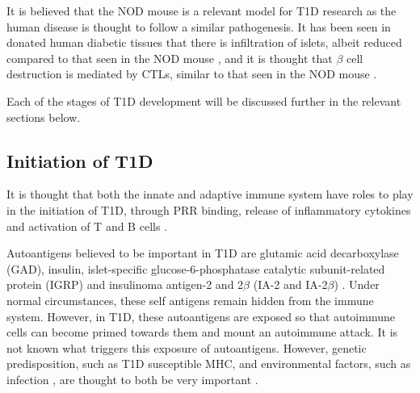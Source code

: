 It is believed that the NOD mouse is a relevant model for T1D research as the human disease is thought to follow a similar pathogenesis.
It has been seen in donated human diabetic tissues that there is infiltration of islets, albeit reduced compared to that seen in the NOD mouse \citep{Veld2014}, and it is thought that $\beta$ cell destruction is mediated by CTLs, similar to that seen in the NOD mouse \citep{Hanafusa2008}. 

Each of the stages of T1D development will be discussed further in the relevant sections below.


\subsection{Initiation of T1D}

It is thought that both the innate and adaptive immune system have roles to play in the initiation of T1D, through PRR binding, release of inflammatory cytokines and activation of T and B cells \citep{Diana2011}.

Autoantigens believed to be important in T1D are glutamic acid decarboxylase (GAD), insulin, islet-specific glucose-6-phosphatase catalytic subunit-related protein (IGRP) and insulinoma antigen-2 and 2$\beta$ (IA-2 and IA-2$\beta$) \citep{Green1999, Roep2012}.
Under normal circumstances, these self antigens remain hidden from the immune system.
However, in T1D, these autoantigens are exposed so that autoimmune cells can become primed towards them and mount an autoimmune attack.
It is not known what triggers this exposure of autoantigens.
However, genetic predisposition, such as T1D susceptible MHC, and environmental factors, such as infection \citep{Filippi2008}, are thought to both be very important \citep{Knip2005}.





